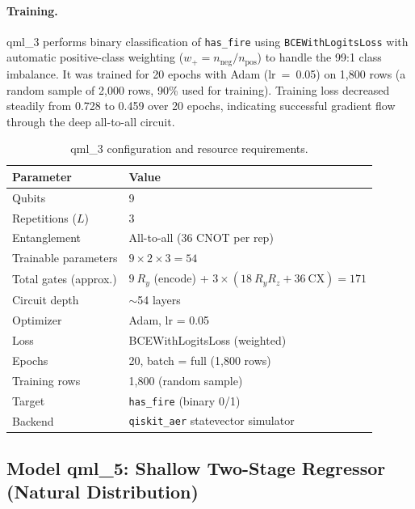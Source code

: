 \documentclass[11pt,a4paper]{article}
\begin{document}
\paragraph{Training.}
qml\_3 performs binary classification of \texttt{has\_fire} using
\texttt{BCEWithLogitsLoss} with automatic positive-class weighting
($w_+ = n_{\text{neg}}/n_{\text{pos}}$) to handle the 99:1 class imbalance.
It was trained for 20 epochs with Adam (lr~=~0.05) on 1,800 rows (a random
sample of 2,000 rows, 90\% used for training). Training loss decreased steadily
from 0.728 to 0.459 over 20 epochs, indicating successful gradient flow through
the deep all-to-all circuit.

\begin{table}[H]
\centering
\caption{qml\_3 configuration and resource requirements.}
\begin{tabular}{ll}
\toprule
\textbf{Parameter} & \textbf{Value} \\
\midrule
Qubits & 9 \\
Repetitions ($L$) & 3 \\
Entanglement & All-to-all (36 CNOT per rep) \\
Trainable parameters & $9 \times 2 \times 3 = 54$ \\
Total gates (approx.) & $9\ R_y$ (encode) + $3 \times (18\ R_yR_z + 36\ \text{CX}) = 171$ \\
Circuit depth & $\sim$54 layers \\
Optimizer & Adam, lr = 0.05 \\
Loss & BCEWithLogitsLoss (weighted) \\
Epochs & 20, batch = full (1,800 rows) \\
Training rows & 1,800 (random sample) \\
Target & \texttt{has\_fire} (binary 0/1) \\
Backend & \texttt{qiskit\_aer} statevector simulator \\
\bottomrule
\end{tabular}
\label{tab:qml3_config}
\end{table}

\subsection{Model qml\_5: Shallow Two-Stage Regressor (Natural Distribution)}
\end{document}
